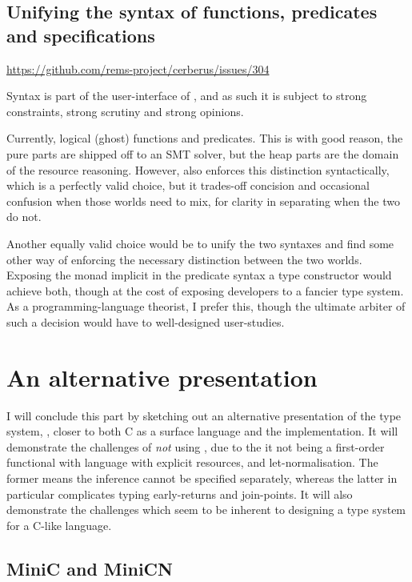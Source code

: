 \section{Unifying the syntax of functions, predicates and specifications}

\url{https://github.com/rems-project/cerberus/issues/304}

Syntax is part of the user-interface of , and as such it is subject to
strong constraints, strong scrutiny and strong opinions.

Currently, logical (ghost) functions and predicates. This is with good reason,
the pure parts are shipped off to an SMT solver, but the heap parts are the
domain of the resource reasoning. However,  also enforces this
distinction syntactically, which is a perfectly valid choice, but it trades-off
concision and occasional confusion when those worlds need to mix, for clarity
in separating when the two do not.

Another equally valid choice would be to unify the two syntaxes and find some
other way of enforcing the necessary distinction between the two worlds.
Exposing the monad implicit in the predicate syntax a type constructor would
achieve both, though at the cost of exposing developers to a fancier type
system. As a programming-language theorist, I prefer this, though the ultimate
arbiter of such a decision would have to well-designed user-studies.

\chapter{An alternative presentation}\label{chap:kernel-alternative}

I will conclude this part by sketching out an alternative presentation of the
 type system, , closer to both C as a surface language and
the  implementation. It will demonstrate the challenges of \emph{not}
using , due to the it not being a first-order functional with
language with explicit resources, and let-normalisation. The former means the
inference cannot be specified separately, whereas the latter in particular
complicates typing early-returns and join-points. It will also demonstrate the
challenges which seem to be inherent to designing a type system for a C-like
language.

\section{MiniC and MiniCN}

